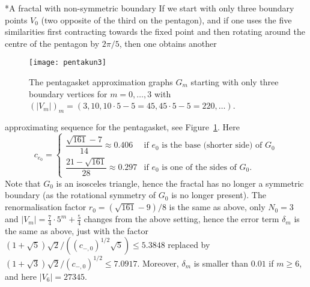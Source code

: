 \documentclass[12pt,reqno,a4paper]{amsart}            %
\makeatletter
\numberwithin{equation}{section}
\newcommand{\myfont}{\sffamily}
\theoremstyle{mythmstyle}       %
\theoremstyle{mydefstyle}        %
\renewcommand\subsubsection{\@startsection{subsubsection}{3}%
  \z@{.5\linespacing\@plus.7\linespacing}{-.5em}%
  {\myfont\bfseries}}
\newcommand{\Fig}[1]{Figure~\ref{fig:#1}}
\newcommand{\card}[1]{\lvert#1\rvert}   %
\newcommand{\1}{\mathbbm 1}                    %
\newcommand{\conductance}{c}  %
\makeatother
\begin{document}
\subsubsection*{A fractal with non-symmetric boundary}
If we start with only three boundary points $V_0$ (two opposite of the
third on the pentagon), and if one uses the five similarities first
contracting towards the fixed point and then rotating around the
centre of the pentagon by $2\pi/5$, then one obtains another
\begin{figure}[h] 
  \centering
  \texttt{[image: pentakun3]}
  \caption{The pentagasket approximation graphs $G_m$ starting with
    only three boundary vertices for $m=0,\dots,3$ with $(\card
    {V_m})_m=(3, 10, 10\cdot 5-5=45, 45\cdot 5-5=220, \dots)$.}
  \label{fig:pentagasket3}
\end{figure}
approximating sequence for the pentagasket, see \Fig{pentagasket3}.
Here
\begin{equation*}
  \conductance_{e_0} =
  \begin{cases}
    \dfrac{\sqrt{161}-7}{14}\approx 0.406
         &\text{if $e_0$ is the base (shorter side) of $G_0$}\\[2ex]
    \dfrac{21-\sqrt{161}}{28}\approx 0.297 
         &\text{if $e_0$ is one of the sides of $G_0$}.
  \end{cases}
\end{equation*}
Note that $G_0$ is an isosceles triangle, hence the fractal has no
longer a symmetric boundary (as the rotational symmetry of $G_0$ is no
longer present).  The renormalisation factor $r_0=(\sqrt{161}-9)/8$ is
the same as above, only $N_0=3$ and
$\card{V_m} %
=\frac74 \cdot 5^m +\frac 54$ changes from the above setting, hence
the error term $\delta_m$ is the same as above, just with the factor
$(1+\sqrt 5)\sqrt 2/((\conductance_{-,0})^{1/2}\sqrt 5) \le 5.3848$
replaced by $(1+\sqrt 3)\sqrt 2/(\conductance_{-,0})^{1/2} \le
7.0917$.  Moreover, $\delta_m$ is smaller than $0.01$ if $m \ge 6$,
and here $\card{V_6}=27345$.


%
%
\end{document}
